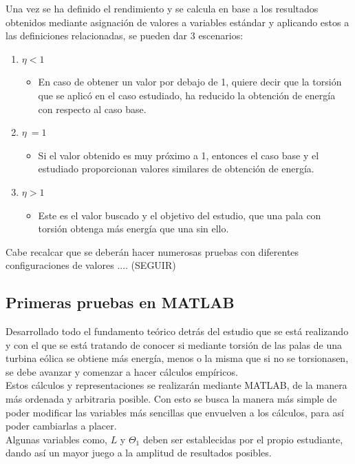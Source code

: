  Una vez se ha definido el rendimiento y se calcula en base a los resultados obtenidos mediante asignación de valores a variables estándar y aplicando estos a las definiciones relacionadas, se pueden dar 3 escenarios:
 

\begin{enumerate}
    \item $\eta < 1$
        \begin{itemize}
            \item En caso de obtener un valor por debajo de 1, quiere decir que la torsión que se aplicó en el caso estudiado, ha reducido la obtención de energía con respecto al caso base. 
        \end{itemize}
    \item $\eta ~= 1$
        \begin{itemize}
            \item Si el valor obtenido es muy próximo a 1, entonces el caso base y el estudiado proporcionan valores similares de obtención de energía.
        \end{itemize}
    \item $\eta > 1$
        \begin{itemize}
            \item Este es el valor buscado y el objetivo del estudio, que una pala con torsión obtenga más energía que una sin ello.
        \end{itemize}
\end{enumerate}

Cabe recalcar que se deberán hacer numerosas pruebas con diferentes configuraciones de valores .... (SEGUIR)
 
\subsection{Primeras pruebas en MATLAB}

Desarrollado todo el fundamento teórico detrás del estudio que se está realizando y con el que se está tratando de conocer si mediante torsión de las palas de una turbina eólica se obtiene más energía, menos o la misma que si no se torsionasen, se debe avanzar y comenzar a hacer cálculos empíricos. \\

Estos cálculos y representaciones se realizarán mediante MATLAB, de la manera más ordenada y arbitraria posible. Con esto se busca la manera más simple de poder modificar las variables más sencillas que envuelven a los cálculos, para así poder cambiarlas a placer. \\

Algunas variables como, $L$ y $\Theta_1$ deben ser establecidas por el propio estudiante, dando así un mayor juego a la amplitud de resultados posibles. \\